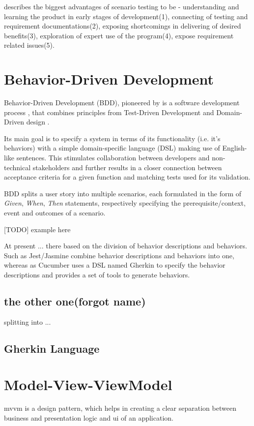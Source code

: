 \textcite{kaner2013introduction} describes the biggest advantages of scenario testing to be  - understanding and learning the product in early stages of development(1), connecting of testing and requirement documentations(2), exposing shortcomings in delivering of desired benefits(3), exploration of expert use of the program(4), expose requirement related issues(5).

\section{Behavior-Driven Development}
Behavior-Driven Development (BDD), pioneered by  \textcite{north2006behavior} is a software development
process , that combines principles from Test-Driven Development and Domain-Driven design \parencite{evans2004domain}.

Its main goal is to specify a system in terms of its functionality (i.e. it's behaviors) with a simple domain-specific language (DSL) making use of English-like sentences. This stimulates collaboration between developers and non-technical stakeholders and further results in a closer connection between acceptance criteria for a given function and matching tests used for its validation.

BDD splits a user story into multiple scenarios, each formulated in the form of \textit{Given}, \textit{When}, \textit{Then} statements, respectively specifying the prerequisite/context, event and outcomes of a scenario. 

[TODO] example here

At present ... there based on the division of behavior descriptions and behaviors. Such as Jest/Jasmine combine behavior descriptions and behaviors into one, whereas as Cucumber uses a DSL named Gherkin to specify the behavior descriptions and provides a set of tools to generate behaviors.


 \subsection{the other one(forgot name)}
 splitting into ...
\subsection{Gherkin Language}

\section{Model-View-ViewModel}
\label{sec:mvvm}
\gls{mvvm} is a design pattern, which helps in creating a clear separation between business and presentation logic and \gls{ui} of an application. \parencite[7-9]{microsoft_mvvm}

